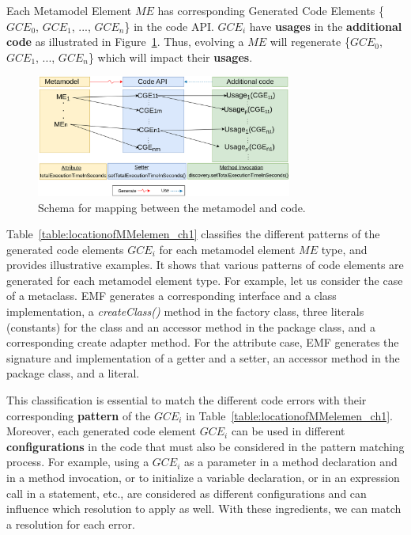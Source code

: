 Each Metamodel Element $ME$ has corresponding Generated Code Elements \{$GCE_0$, $GCE_1$, ..., $GCE_n$\} in the code API. 
$GCE_i$ have \textbf{usages} in the \textbf{additional code} as illustrated in Figure~\ref{fig:patternconcept}.
Thus, evolving a $ME$ will regenerate \{$GCE_0$, $GCE_1$, ..., $GCE_n$\} which will impact their \textbf{usages}. 
%
\begin{figure}[H]
	\centering
	\includegraphics[width=0.75\textwidth]{./pics/chapter1pics/patternusages.png}
	\caption{Schema for mapping between the metamodel and code.}
	\label{fig:patternconcept}
	\vspace{-1em}
	
\end{figure}


Table~\ref{table:locationofMMelemen_ch1} classifies the different patterns of the generated code elements $GCE_i$ for each metamodel element $ME$ type, and provides illustrative examples. It shows that various patterns of code elements are generated for each metamodel element type. %
For example, let us consider the case of a metaclass. EMF generates a corresponding interface and a class implementation, a \emph{createClass()} method in the factory class, three literals (\ie constants) for the class and an accessor method in the package class, and a corresponding create adapter method. For the attribute case, EMF generates the signature and implementation of a getter and a setter, an accessor method in the package class, and a literal. 

This classification is essential to match the different code errors with their corresponding \textbf{pattern} of the $GCE_i$ in Table~\ref{table:locationofMMelemen_ch1}. 
%
Moreover, each generated code element $GCE_i$ can be used in different \textbf{configurations} in the code that must also be considered in the pattern matching process. For example, using a $GCE_i$ as a parameter in a method declaration and in a method invocation, or to initialize a variable declaration, or in an expression call in a statement, etc., are considered as different configurations and can influence which resolution to apply as well. With these ingredients, we can match a resolution for each error. 






